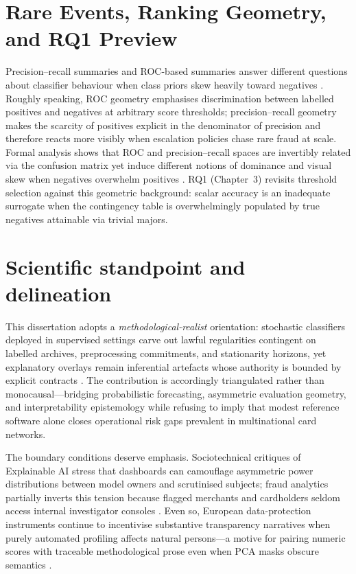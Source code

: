 \section{Rare Events, Ranking Geometry, and RQ1 Preview}
Precision--recall summaries and ROC-based summaries answer different questions about classifier behaviour when class priors skew heavily toward negatives \cite{davis_goadrich_icml06,fraud_handbook}. Roughly speaking, ROC geometry emphasises discrimination between labelled positives and negatives at arbitrary score thresholds; precision--recall geometry makes the scarcity of positives explicit in the denominator of precision and therefore reacts more visibly when escalation policies chase rare fraud at scale. Formal analysis shows that ROC and precision--recall spaces are invertibly related via the confusion matrix yet induce different notions of dominance and visual skew when negatives overwhelm positives \cite{davis_goadrich_icml06}. RQ1 (Chapter~3) revisits threshold selection against this geometric background: scalar accuracy is an inadequate surrogate when the contingency table is overwhelmingly populated by true negatives attainable via trivial majors.

\section{Scientific standpoint and delineation}
This dissertation adopts a \emph{methodological-realist} orientation: stochastic classifiers deployed in supervised settings carve out lawful regularities contingent on labelled archives, preprocessing commitments, and stationarity horizons, yet explanatory overlays remain inferential artefacts whose authority is bounded by explicit contracts \cite{rudin_stopexplaining2019,xai_survey}. The contribution is accordingly triangulated rather than monocausal—bridging probabilistic forecasting, asymmetric evaluation geometry, and interpretability epistemology while refusing to imply that modest reference software alone closes operational risk gaps prevalent in multinational card networks.

The boundary conditions deserve emphasis. Sociotechnical critiques of Explainable AI stress that dashboards can camouflage asymmetric power distributions between model owners and scrutinised subjects; fraud analytics partially inverts this tension because flagged merchants and cardholders seldom access internal investigator consoles \cite{xai_survey,gdpr_text}. Even so, European data-protection instruments continue to incentivise substantive transparency narratives when purely automated profiling affects natural persons---a motive for pairing numeric scores with traceable methodological prose even when PCA masks obscure semantics \cite{gdpr_text}.

